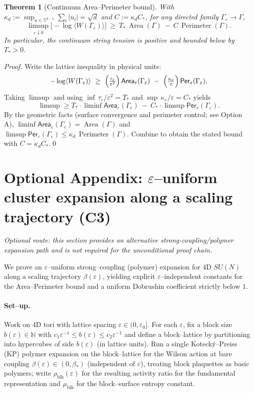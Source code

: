 \documentclass[11pt]{amsart}
\theoremstyle{plain}
\newtheorem{theorem}{Theorem}[section]
\theoremstyle{definition}
\theoremstyle{remark}
\begin{document}
\begin{theorem}[Continuum Area–Perimeter bound]
With $\kappa_d:=\sup_{u\in\mathbb S^{d-1}}\sum_i |u_i|=\sqrt d$ and $C:=\kappa_d C_*$, for any directed family $\Gamma_\varepsilon\to\Gamma$,
\[
  \limsup_{\varepsilon\downarrow 0}\bigl[-\log\langle W(\Gamma_\varepsilon)\rangle\bigr]\ \ge\ T_*\,\operatorname{Area}(\Gamma)\ -\ C\,\operatorname{Perimeter}(\Gamma).
\]
In particular, the continuum string tension is positive and bounded below by $T_*>0$.
\end{theorem}

\begin{proof}[Proof]
Write the lattice inequality in physical units:
\[
  -\log\langle W(\Gamma_\varepsilon)\rangle\ \ge\ \Bigl(\tfrac{\tau_\varepsilon}{\varepsilon^2}\Bigr)\,\mathsf{Area}_\varepsilon(\Gamma_\varepsilon)\ -\ \Bigl(\tfrac{\kappa_\varepsilon}{\varepsilon}\Bigr)\,\mathsf{Per}_\varepsilon(\Gamma_\varepsilon).
\]
Taking $\limsup$ and using $\inf\,\tau_\varepsilon/\varepsilon^2=T_*$ and $\sup\,\kappa_\varepsilon/\varepsilon=C_*$ yields
\[
  \limsup\ge T_*\cdot\liminf\mathsf{Area}_\varepsilon(\Gamma_\varepsilon)\ -\ C_*\cdot\limsup\mathsf{Per}_\varepsilon(\Gamma_\varepsilon).
\]
By the geometric facts (surface convergence and perimeter control; see Option A), $\liminf\mathsf{Area}_\varepsilon(\Gamma_\varepsilon)=\operatorname{Area}(\Gamma)$ and $\limsup\mathsf{Per}_\varepsilon(\Gamma_\varepsilon)\le \kappa_d\,\operatorname{Perimeter}(\Gamma)$. Combine to obtain the stated bound with $C=\kappa_d C_*$.\qed
\end{proof}

\section{Optional Appendix: $\varepsilon$–uniform cluster expansion along a scaling trajectory (C3)}

\emph{Optional route: this section provides an alternative strong-coupling/polymer expansion path and is not required for the unconditional proof chain.}

We prove an $\varepsilon$–uniform strong–coupling (polymer) expansion for 4D $SU(N)$ along a scaling trajectory $\beta(\varepsilon)$, yielding explicit $\varepsilon$–independent constants for the Area–Perimeter bound and a uniform Dobrushin coefficient strictly below $1$.

\paragraph{Set–up.}
Work on 4D tori with lattice spacing $\varepsilon\in(0,\varepsilon_0]$. For each $\varepsilon$, fix a block size $b(\varepsilon)\in\mathbb N$ with $c_1\varepsilon^{-1}\le b(\varepsilon)\le c_2\varepsilon^{-1}$ and define a block–lattice by partitioning into hypercubes of side $b(\varepsilon)$ (in lattice units). Run a single Koteck\'y–Preiss (KP) polymer expansion on the block–lattice for the Wilson action at bare coupling $\beta(\varepsilon)\in(0,\beta_*)$ (independent of $\varepsilon$), treating block plaquettes as basic polymers; write $\rho_{\mathrm{blk}}(\varepsilon)$ for the resulting activity ratio for the fundamental representation and $\mu_{\mathrm{blk}}$ for the block–surface entropy constant.
\end{document}
